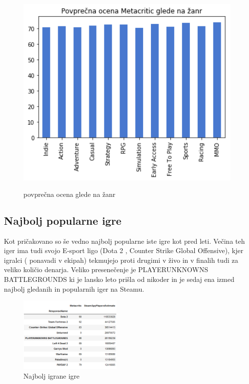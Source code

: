 \documentclass[a4paper]{article}
\begin{document}
\begin{figure}[h]
    \centering
    \begin{minipage}{0.45\textwidth}
				\caption{povprečna ocena glede na žanr}
			\includegraphics[width=1\textwidth,keepaspectratio]{zanr-meta-pov.png}

			\label{fig:score-by-genre}
    \end{minipage}\hfill
\end{figure}
\newpage
\subsection{Najbolj popularne igre }
Kot pričakovano so še vedno najbolj popularne iste igre kot pred leti.
Večina teh iger ima tudi  svojo E-sport ligo (Dota 2 , Counter Strike Global Offensive), kjer igralci ( ponavadi v ekipah) tekmujejo proti drugimi v živo in v finalih tudi za veliko količio denarja.
Veliko presenečenje je PLAYERUNKNOWNS BATTLEGROUNDS 	ki je lansko leto prišla od nikoder in je sedaj ena izmed najbolj gledanih in popularnih iger na Steamu.

\begin{figure}[h]
    \centering

			\includegraphics[width=0.45\textwidth,keepaspectratio]{Top10MostPlayed.png}
			\caption{Najbolj igrane igre}
			\label{fig:most-played}

\end{figure}
\end{document}
